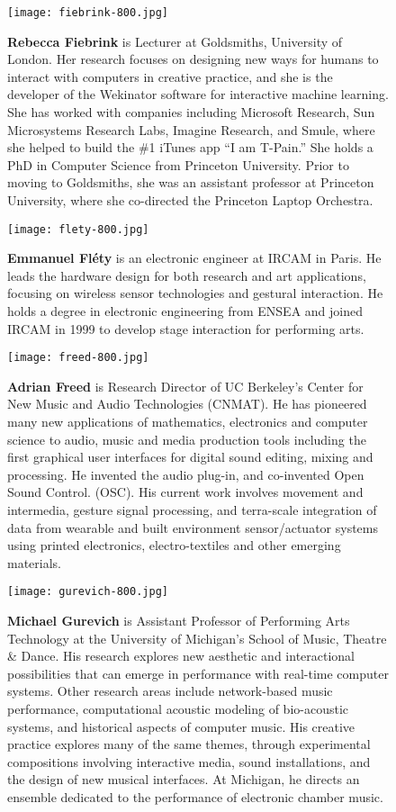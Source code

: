 \begin{authbio}
\begin{figure}[H]
  \sidecaption[t]
  \texttt{[image: fiebrink-800.jpg]}
  \caption{\textbf{Rebecca Fiebrink} is Lecturer at Goldsmiths, University of London. Her research focuses on designing new ways for humans to interact with computers in creative practice, and she is the developer of the Wekinator software for interactive machine learning. She has worked with companies including Microsoft Research, Sun Microsystems Research Labs, Imagine Research, and Smule, where she helped to build the \#1 iTunes app ``I am T-Pain.'' She holds a PhD in Computer Science from Princeton University. Prior to moving to Goldsmiths, she was an assistant professor at Princeton University, where she co-directed the Princeton Laptop Orchestra.}
\end{figure}


\begin{figure}[H]
  \sidecaption[t]
  \texttt{[image: flety-800.jpg]}
  \caption{\textbf{Emmanuel Fl\'ety} is an electronic engineer at IRCAM in Paris. He leads the hardware design for both research and art applications, focusing on wireless sensor technologies and gestural interaction. He holds a degree in electronic engineering from ENSEA and joined IRCAM in 1999 to develop stage interaction for performing arts.}
\end{figure}

\begin{figure}[H]
  \sidecaption[t]
  \texttt{[image: freed-800.jpg]}
  \caption{\textbf{Adrian Freed} is Research Director of UC Berkeley's Center for New Music and Audio Technologies (CNMAT). He has pioneered many new applications of mathematics, electronics and computer science to audio, music and media production tools including the first graphical user interfaces for digital sound editing, mixing and processing. He invented the audio plug-in, and co-invented Open Sound Control. (OSC). His current work involves movement and intermedia, gesture signal processing, and terra-scale integration of data from wearable and built environment sensor/actuator systems using printed electronics, electro-textiles and other emerging materials.}
\end{figure}

\begin{figure}[H]
  \sidecaption[t]
  \texttt{[image: gurevich-800.jpg]}
  \caption{\textbf{Michael Gurevich} is Assistant Professor of Performing Arts Technology at the University of Michigan's School of Music, Theatre \& Dance. His research explores new aesthetic and interactional possibilities that can emerge in performance with real-time computer systems. Other research areas include network-based music performance, computational acoustic modeling of bio-acoustic systems, and historical aspects of computer music. His creative practice explores many of the same themes, through experimental compositions involving interactive media, sound installations, and the design of new musical interfaces. At Michigan, he directs an ensemble dedicated to the performance of electronic chamber music.}
\end{figure}


\end{authbio}
